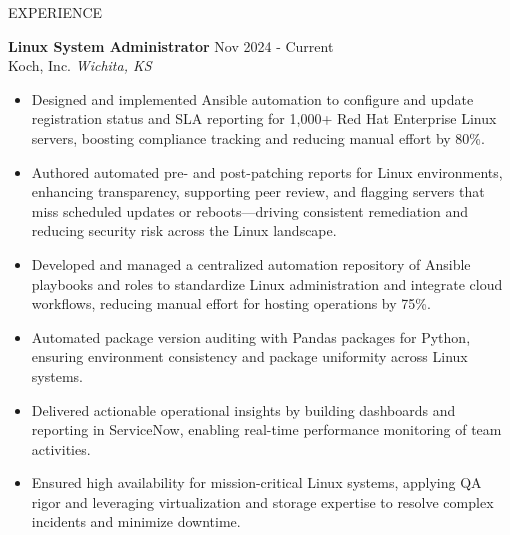 \documentclass{resume} %
\begin{document}
\begin{rSection}{EXPERIENCE}

\textbf{Linux System Administrator} \hfill Nov 2024 - Current\\
Koch, Inc. \hfill \textit{Wichita, KS}
\begin{itemize}
\itemsep -3pt {}
    \item Designed and implemented Ansible automation to configure and update registration status and SLA reporting for 1,000+ Red Hat Enterprise Linux servers, boosting compliance tracking and reducing manual effort by 80\%.
    \item Authored automated pre- and post-patching reports for Linux environments, enhancing transparency, supporting peer review, and flagging servers that miss scheduled updates or reboots---driving consistent remediation and reducing security risk across the Linux landscape.
    \item Developed and managed a centralized automation repository of Ansible playbooks and roles to standardize Linux administration and integrate cloud workflows, reducing manual effort for hosting operations by 75\%. 
    \item Automated package version auditing with Pandas packages for Python, ensuring environment consistency and package uniformity across Linux systems.
    \item Delivered actionable operational insights by building dashboards and reporting in ServiceNow, enabling real-time performance monitoring of team activities.
    \item Ensured high availability for mission-critical Linux systems, applying QA rigor and leveraging virtualization and storage expertise to resolve complex incidents and minimize downtime.
 \end{itemize}
 

\end{rSection}
\end{document}

